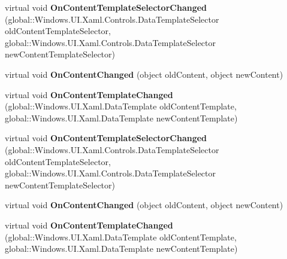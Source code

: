 \begin{DoxyCompactItemize}
virtual void {\bfseries On\+Content\+Template\+Selector\+Changed} (global\+::\+Windows.\+U\+I.\+Xaml.\+Controls.\+Data\+Template\+Selector old\+Content\+Template\+Selector, global\+::\+Windows.\+U\+I.\+Xaml.\+Controls.\+Data\+Template\+Selector new\+Content\+Template\+Selector)
\item 
\mbox{\label{class_windows_1_1_u_i_1_1_xaml_1_1_controls_1_1_content_control_ad866ceae79da192e052f451b2a2070a1}} 
virtual void {\bfseries On\+Content\+Changed} (object old\+Content, object new\+Content)
\item 
\mbox{\label{class_windows_1_1_u_i_1_1_xaml_1_1_controls_1_1_content_control_af0e4eade7bb6b73242fbc48c0be8761f}} 
virtual void {\bfseries On\+Content\+Template\+Changed} (global\+::\+Windows.\+U\+I.\+Xaml.\+Data\+Template old\+Content\+Template, global\+::\+Windows.\+U\+I.\+Xaml.\+Data\+Template new\+Content\+Template)
\item 
\mbox{\label{class_windows_1_1_u_i_1_1_xaml_1_1_controls_1_1_content_control_a814a04f46ae960523984ba3c434f195c}} 
virtual void {\bfseries On\+Content\+Template\+Selector\+Changed} (global\+::\+Windows.\+U\+I.\+Xaml.\+Controls.\+Data\+Template\+Selector old\+Content\+Template\+Selector, global\+::\+Windows.\+U\+I.\+Xaml.\+Controls.\+Data\+Template\+Selector new\+Content\+Template\+Selector)
\item 
\mbox{\label{class_windows_1_1_u_i_1_1_xaml_1_1_controls_1_1_content_control_ad866ceae79da192e052f451b2a2070a1}} 
virtual void {\bfseries On\+Content\+Changed} (object old\+Content, object new\+Content)
\item 
\mbox{\label{class_windows_1_1_u_i_1_1_xaml_1_1_controls_1_1_content_control_af0e4eade7bb6b73242fbc48c0be8761f}} 
virtual void {\bfseries On\+Content\+Template\+Changed} (global\+::\+Windows.\+U\+I.\+Xaml.\+Data\+Template old\+Content\+Template, global\+::\+Windows.\+U\+I.\+Xaml.\+Data\+Template new\+Content\+Template)
\item 
\mbox{\label{class_windows_1_1_u_i_1_1_xaml_1_1_controls_1_1_content_control_a814a04f46ae960523984ba3c434f195c}} 

\end{DoxyCompactItemize}
